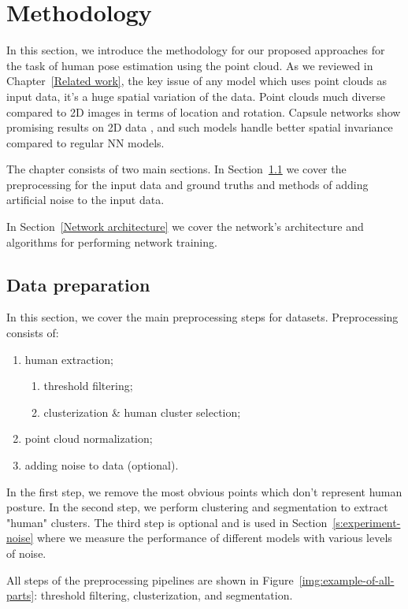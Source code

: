 \chapter{Methodology}
\label{Methodology}

In this section, we introduce the methodology for our proposed approaches for the task of human pose estimation using the point cloud. As we reviewed in Chapter~\ref{Related work}, the key issue of any model which uses point clouds as input data, it's a huge spatial variation of the data. Point clouds much diverse compared to 2D images in terms of location and rotation. Capsule networks show promising results on 2D data \parencite{sabour_dynamic_2017}, and such models handle better spatial invariance compared to regular NN models.

The chapter consists of two main sections. In Section~\ref{Data-preparation} we cover the preprocessing for the input data and ground truths and methods of adding artificial noise to the input data. 

In Section~\ref{Network architecture} we cover the network's architecture and algorithms for performing network training.


\section{Data preparation}
\label{Data-preparation}
In this section, we cover the main preprocessing steps for datasets. Preprocessing consists of:
\begin{enumerate}
  \item human extraction;
  \begin{enumerate}
    \item threshold filtering;
    \item clusterization \& human cluster selection;
  \end{enumerate}
  \item point cloud normalization;
  \item adding noise to data (optional).
\end{enumerate}

In the first step, we remove the most obvious points which don't represent human posture. In the second step, we perform clustering and segmentation to extract "human" clusters. The third step is optional and is used in Section~\ref{s:experiment-noise} where we measure the performance of different models with various levels of noise. 

All steps of the preprocessing pipelines are shown in Figure~\ref{img:example-of-all-parts}: threshold filtering, clusterization, and segmentation.

